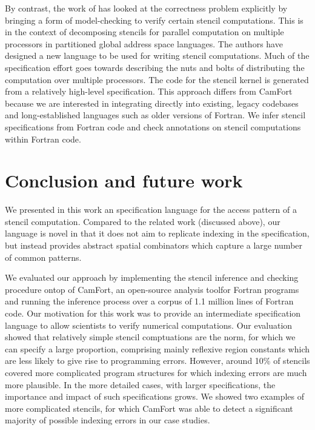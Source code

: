 \documentclass[9pt]{sigplanconf}
\theoremstyle{definition}
\newcommand{\eg}{\emph{e.g.}}
\begin{document}
By contrast, the work of \citet{Abe:2013:IPDPSW} has looked at the
correctness problem explicitly by bringing a form of model-checking to
verify certain stencil computations. This is in the context of
decomposing stencils for parallel computation on multiple processors
 in partitioned global address
space languages. %
The authors have designed a new language to
be used for writing stencil computations. Much of the specification
effort goes towards describing the nuts and bolts of distributing the
computation over multiple processors. The code for the stencil kernel
is generated from a relatively high-level specification. This approach
differs from CamFort because we are interested in integrating directly
into existing, legacy codebases and long-established languages such as
older versions of Fortran. We infer stencil specifications from
Fortran code and check annotations on stencil computations within
Fortran code.


\section{Conclusion and future work}

We presented in this work an specification language 
for the access pattern of a stencil computation. Compared to the
related work (discussed above), our language is novel in that it does
not aim to replicate indexing in the specification, but instead
provides abstract spatial combinators which capture a large number
of common patterns. 

We evaluated our approach by implementing the stencil inference and
checking procedure ontop of CamFort, an open-source analysis
tool\footnotemark for Fortran
programs and running the inference process over a corpus of 1.1
million lines of Fortran code.  Our motivation for this work was to
provide an intermediate specification language to allow scientists to
verify numerical computations.  Our evaluation showed that relatively
simple stencil comptuations are the norm, for which we can specify a
large proportion, comprising mainly reflexive region constants which
are less likely to give rise to programming errors.  However, around
10\% of stencils covered more complicated program structures for which
indexing errors are much more plausible. In the more detailed cases,
with larger specifications, the importance and impact of such
specifications grows.  We showed two examples of more complicated
stencils, for which CamFort was able to detect a significant majority
of possible indexing errors in our case studies.
\end{document}
